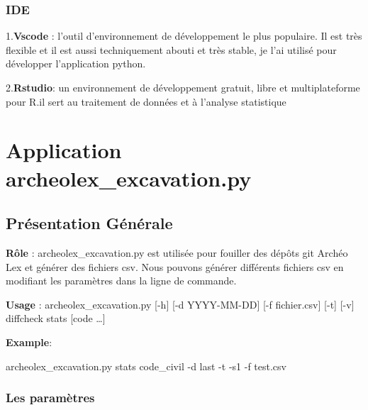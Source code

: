\documentclass[
  oneside]{book}
\newenvironment{Shaded}{\begin{snugshade}}{\end{snugshade}}
\newcommand{\NormalTok}[1]{#1}
\newcommand{\SpecialCharTok}[1]{\textcolor[rgb]{0.00,0.00,0.00}{#1}}
\begin{document}
\hypertarget{ide}{%
\subsection{IDE}\label{ide}}

1.\textbf{Vscode} : l'outil d'environnement de développement le plus populaire. Il est très flexible et il est aussi techniquement abouti et très stable, je l'ai utilisé pour développer l'application python.

2.\textbf{Rstudio}: un environnement de développement gratuit, libre et multiplateforme pour R.il sert au traitement de données et à l'analyse statistique

\hypertarget{Application}{%
\chapter{Application archeolex\_excavation.py}\label{Application}}

\hypertarget{pruxe9sentation-guxe9nuxe9rale}{%
\section{Présentation Générale}\label{pruxe9sentation-guxe9nuxe9rale}}

\textbf{Rôle} : archeolex\_excavation.py est utilisée pour fouiller des dépôts git Archéo Lex et générer des fichiers csv. Nous pouvons générer différents fichiers csv en modifiant les paramètres dans la ligne de commande.

\textbf{Usage} : archeolex\_excavation.py {[}-h{]} {[}-d YYYY-MM-DD{]} {[}-f fichier.csv{]} {[}-t{]} {[}-v{]} diff\textbar check\textbar{} \textbar stats {[}code \ldots{]}

\textbf{Example}:

\begin{Shaded}
\begin{Highlighting}[]
\NormalTok{archeolex\_excavation.py stats code\_civil }\SpecialCharTok{{-}}\NormalTok{d last }\SpecialCharTok{{-}}\NormalTok{t }\SpecialCharTok{{-}}\NormalTok{s1 }\SpecialCharTok{{-}}\NormalTok{f test.csv}
\end{Highlighting}
\end{Shaded}

\hypertarget{les-paramuxe8tres}{%
\subsection{Les paramètres}\label{les-paramuxe8tres}}
\end{document}
